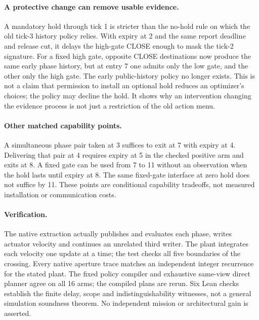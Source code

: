 \documentclass{article}
\begin{document}
\paragraph{A protective change can remove usable evidence.}
A mandatory hold through tick 1 is stricter than the no-hold
rule on which the old tick-3 history policy relies. With expiry
at 2 and the same report deadline and release cut, it delays
the high-gate CLOSE enough to mask the tick-2 signature. For a
fixed high gate, opposite CLOSE destinations now produce the
same early phase history, but at entry 7 one admits only the
low gate, and the other only the high gate. The early
public-history policy no longer exists. This is not a claim
that permission to install an optional hold reduces an
optimizer's choices; the policy may decline the hold. It
shows why an intervention changing the evidence process is
not just a restriction of the old action menu.

\paragraph{Other matched capability points.}
A simultaneous phase pair taken at 3 suffices to exit at 7 with
expiry at 4. Delivering that pair at 4 requires expiry at 5 in
the checked positive arm and exits at 8. A fixed gate can be
used from 7 to 11 without an observation when the hold lasts
until expiry at 8. The same fixed-gate interface at zero hold
does not suffice by 11. These points are conditional capability
tradeoffs, not measured installation or communication costs.

\paragraph{Verification.}
The native extraction actually publishes and evaluates each
phase, writes actuator velocity and continues an unrelated third
writer. The plant integrates each velocity one update at a time;
the test checks all five boundaries of the crossing. Every native
aperture trace matches an independent integer recurrence for the
stated plant. The fixed policy compiler and exhaustive same-view
direct planner agree on all 16 arms; the compiled plans are rerun.
Six Lean checks establish the finite delay, scope and
indistinguishability witnesses, not a general simulation soundness
theorem. No independent mission or architectural gain is asserted.
\end{document}
